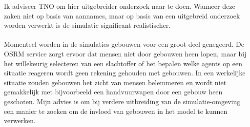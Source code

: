 \documentclass[12pt, letterpaper]{article}
\begin{document}
Ik adviseer TNO om hier uitgebreider onderzoek naar te doen. Wanneer deze zaken niet op basis van aannames, maar op basis van een uitgebreid onderzoek worden verwerkt is de simulatie significant realistischer. 
\\ \\
Momenteel worden in de simulaties gebouwen voor een groot deel genegeerd. De OSRM service zorgt ervoor dat mensen niet door gebouwen heen lopen, maar bij het willekeurig selecteren van een slachtoffer of het bepalen welke agents op een situatie reageren wordt geen rekening gehouden met gebouwen. In een werkelijke situatie zouden gebouwen het zicht van mensen belemmeren en wordt niet gemakkelijk met bijvoorbeeld een handvuurwapen door een gebouw heen geschoten. Mijn advies is om bij verdere uitbreiding van de simulatie-omgeving een manier te zoeken om de invloed van gebouwen in het model te kunnen verwerken. 
\end{document}
